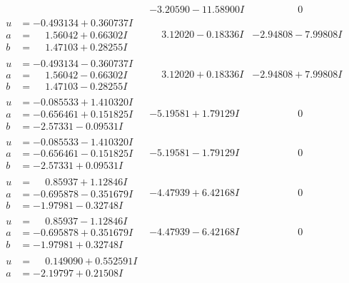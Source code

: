 \documentclass[1p]{elsarticle_modified}
\theoremstyle{definition}
\begin{document}
$$\begin{array}{c|c|c}
 & -3.20590 - 11.58900 I & \phantom{-0.000000 } 0 \\ \hline\begin{aligned}
u &= -0.493134 + 0.360737 I \\
a &= \phantom{-}1.56042 + 0.66302 I \\
b &= \phantom{-}1.47103 + 0.28255 I\end{aligned}
 & \phantom{-}3.12020 - 0.18336 I & -2.94808 - 7.99808 I \\ \hline\begin{aligned}
u &= -0.493134 - 0.360737 I \\
a &= \phantom{-}1.56042 - 0.66302 I \\
b &= \phantom{-}1.47103 - 0.28255 I\end{aligned}
 & \phantom{-}3.12020 + 0.18336 I & -2.94808 + 7.99808 I \\ \hline\begin{aligned}
u &= -0.085533 + 1.410320 I \\
a &= -0.656461 + 0.151825 I \\
b &= -2.57331 - 0.09531 I\end{aligned}
 & -5.19581 + 1.79129 I & \phantom{-0.000000 } 0 \\ \hline\begin{aligned}
u &= -0.085533 - 1.410320 I \\
a &= -0.656461 - 0.151825 I \\
b &= -2.57331 + 0.09531 I\end{aligned}
 & -5.19581 - 1.79129 I & \phantom{-0.000000 } 0 \\ \hline\begin{aligned}
u &= \phantom{-}0.85937 + 1.12846 I \\
a &= -0.695878 - 0.351679 I \\
b &= -1.97981 - 0.32748 I\end{aligned}
 & -4.47939 + 6.42168 I & \phantom{-0.000000 } 0 \\ \hline\begin{aligned}
u &= \phantom{-}0.85937 - 1.12846 I \\
a &= -0.695878 + 0.351679 I \\
b &= -1.97981 + 0.32748 I\end{aligned}
 & -4.47939 - 6.42168 I & \phantom{-0.000000 } 0 \\ \hline\begin{aligned}
u &= \phantom{-}0.149090 + 0.552591 I \\
a &= -2.19797 + 0.21508 I \\

\end{aligned}
\end{array}$$
\end{document}
